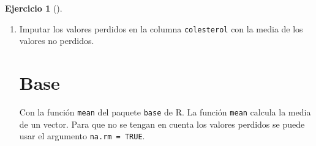 \documentclass[
  spanish,
  a4paper,
]{scrreport}
\theoremstyle{definition}
\newtheorem{exercise}{Ejercicio}[chapter]
\theoremstyle{remark}
\begin{document}
\begin{exercise}[]
\begin{enumerate}
\begin{tcolorbox}
\begin{verbatim}
# A tibble: 13 x 8
   nombre                      edad sexo   peso altura colesterol   imc Obesidad
   <chr>                      <dbl> <chr> <dbl>  <dbl>      <dbl> <dbl> <fct>   
 1 José Luis Martínez Izquie~    18 H        85   1.79        182    27 Sobrepe~
 2 Rosa Díaz Díaz                32 M        65   1.73        232    22 Saludab~
 3 Javier García Sánchez         24 H        NA   1.81        191    NA <NA>    
 4 Carmen López Pinzón           35 M        65   1.7         200    22 Saludab~
 5 Marisa López Collado          46 M        51   1.58        148    20 Saludab~
 6 Antonio Ruiz Cruz             68 H        66   1.74        249    22 Saludab~
 7 Antonio Fernández Ocaña       51 H        62   1.72        276    21 Saludab~
 8 Pedro Gálvez Tenorio          35 H        90   1.94        241    24 Saludab~
 9 Santiago Reillo Manzano       46 H        75   1.85        280    22 Saludab~
10 Macarena Álvarez Luna         53 M        55   1.62        262    21 Saludab~
11 José María de la Guía Sanz    58 H        78   1.87        198    22 Saludab~
12 Miguel Angel Cuadrado Gut~    27 H       109   1.98        210    28 Sobrepe~
13 Carolina Rubio Moreno         20 M        61   1.77        194    19 Saludab~
\end{verbatim}

  \end{tcolorbox}
\item
  Imputar los valores perdidos en la columna \texttt{colesterol} con la
  media de los valores no perdidos.

  \begin{tcolorbox}[enhanced jigsaw, titlerule=0mm, arc=.35mm, rightrule=.15mm, opacitybacktitle=0.6, leftrule=.75mm, colframe=quarto-callout-tip-color-frame, toptitle=1mm, breakable, colbacktitle=quarto-callout-tip-color!10!white, bottomrule=.15mm, colback=white, left=2mm, bottomtitle=1mm, opacityback=0, title=\textcolor{quarto-callout-tip-color}{\faLightbulb}\hspace{0.5em}{Solución}, toprule=.15mm, coltitle=black]

  \section{Base}

  Con la función \texttt{mean} del paquete \texttt{base} de R. La
  función \texttt{mean} calcula la media de un vector. Para que no se
  tengan en cuenta los valores perdidos se puede usar el argumento
  \texttt{na.rm\ =\ TRUE}.


\end{tcolorbox}
\end{enumerate}
\end{exercise}
\end{document}
